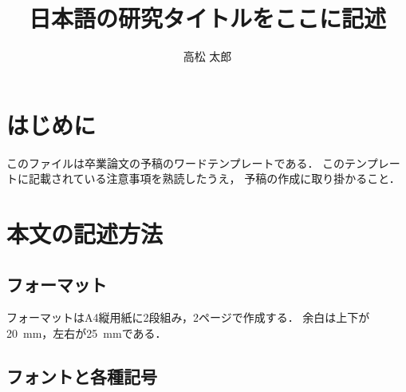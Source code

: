 \documentclass[a4j]{jsarticle}
\title{日本語の研究タイトルをここに記述}
\author{高松 太郎}
\begin{document}
\maketitle%



\thispagestyle{empty}
\pagestyle{empty}

\section{はじめに}

このファイルは卒業論文の予稿のワードテンプレートである．
このテンプレートに記載されている注意事項を熟読したうえ，
予稿の作成に取り掛かること．

\section{本文の記述方法}

\subsection{フォーマット}

フォーマットはA4縦用紙に2段組み，2ページで作成する．
余白は上下が20~mm，左右が25~mmである．

\subsection{フォントと各種記号}
\end{document}
